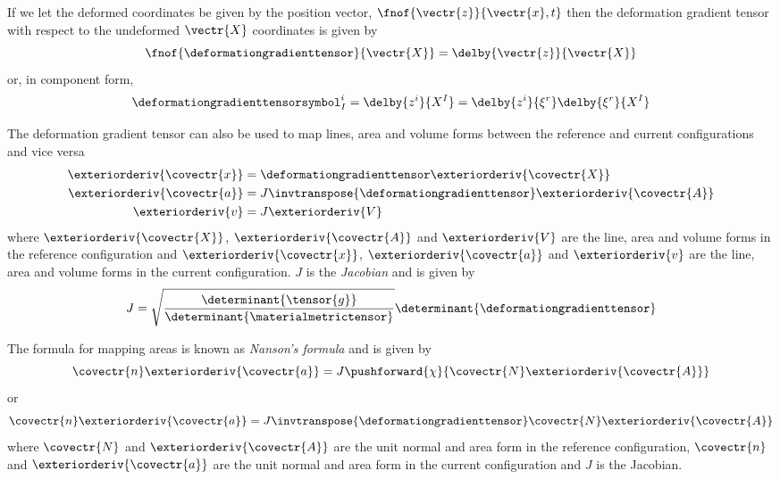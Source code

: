 If we let the deformed coordinates be given by the position vector,
$\fnof{\vectr{z}}{\vectr{x},t}$ then the deformation gradient tensor with
respect to the undeformed $\vectr{X}$ coordinates is given by
\begin{equation}
  \fnof{\deformationgradienttensor}{\vectr{X}}=\delby{\vectr{z}}{\vectr{X}}
\end{equation} 
or, in component form,
\begin{equation}
  \deformationgradienttensorsymbol^{i}_{I}=\delby{z^{i}}{X^{I}}=\delby{z^{i}}{\xi^{r}}\delby{\xi^{r}}{X^{I}}
\end{equation}

The deformation gradient tensor can also be used to map lines, area and volume forms
between the reference and current configurations and vice versa \ie
\begin{align}
  \exteriorderiv{\covectr{x}} &= \deformationgradienttensor\exteriorderiv{\covectr{X}} \\
  \exteriorderiv{\covectr{a}} &= J\invtranspose{\deformationgradienttensor}\exteriorderiv{\covectr{A}} \\
  \exteriorderiv{v} &= J\exteriorderiv{V}
\end{align}
where $\exteriorderiv{\covectr{X}}$, $\exteriorderiv{\covectr{A}}$ and
$\exteriorderiv{V}$ are the line, area and volume forms in the reference
configuration and $\exteriorderiv{\covectr{x}}$, $\exteriorderiv{\covectr{a}}$ and
$\exteriorderiv{v}$ are the line, area and volume forms in the current
configuration. $J$ is the \emph{Jacobian} and is given by
\begin{equation}
  J=\sqrt{\dfrac{\determinant{\tensor{g}}}{\determinant{\materialmetrictensor}}}\determinant{\deformationgradienttensor}
\end{equation}

The formula for mapping areas is known as \emph{Nanson's formula} and is
given by
\begin{equation}
  \covectr{n}\exteriorderiv{\covectr{a}}=J\pushforward{\chi}{\covectr{N}\exteriorderiv{\covectr{A}}}
\end{equation}
or
\begin{equation}
  \covectr{n}\exteriorderiv{\covectr{a}}=J\invtranspose{\deformationgradienttensor}\covectr{N}\exteriorderiv{\covectr{A}}
\end{equation}
where $\covectr{N}$ and $\exteriorderiv{\covectr{A}}$ are the unit normal and
area form in the reference configuration,  $\covectr{n}$ and $\exteriorderiv{\covectr{a}}$ are the unit normal and
area form in the current configuration and $J$ is the Jacobian. 
  
